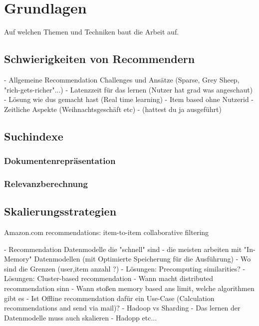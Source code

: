 \section{Grundlagen}
	Auf welchen Themen und Techniken baut die Arbeit auf.




\subsection{Schwierigkeiten von Recommendern}

- Allgemeine Recommendation Challenges und Ansätze (Sparse, Grey Sheep, "rich-gets-richer"...)
- Latenzzeit für das lernen (Nutzer hat grad was angeschaut)
- Lösung wie dus gemacht hast (Real time learning)
- Item based ohne Nutzerid
- Zeitliche Aspekte (Weihnachtsgeschäft etc) - (hattest du ja ausgeführt)


\subsection{Suchindexe}
\subsubsection{Dokumentenrepräsentation}
\subsubsection{Relevanzberechnung}\newpage


\subsection{Skalierungsstrategien}


\citep{linden03} Amazon.com recommendations: item-to-item collaborative filtering

 - Recommendation Datenmodelle die "schnell" sind
- die meisten arbeiten mit "In-Memory" Datenmodellen (mit Optimierte Speicherung für die Ausführung)
        - Wo sind die Grenzen (user,item anzahl ?)
        - Lösungen: Precomputing similarities? 
  - Lösungen: Cluster-based recommendation
- Wann macht distributed recommendation sinn
  - Wann stoßen memory based ans limit, welche algorithmen gibt es
  - Ist Offline recommendation dafür ein Use-Case (Calculation recommendations and send via mail)?
  - Hadoop vs Sharding
  - Das lernen der Datenmodelle muss auch skalieren
- Hadopp etc...

